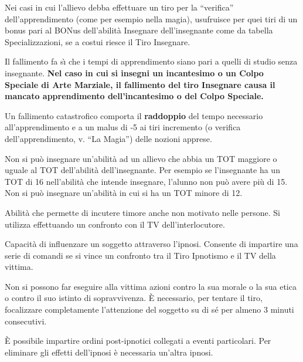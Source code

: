 Nei casi in cui l'allievo debba effettuare un tiro per la ``verifica''
dell'apprendimento (come per esempio nella magia), usufruisce per quei
tiri di un bonus pari al BONus dell'abilit\`a Insegnare
dell'insegnante come da tabella Specializzazioni, se a costui riesce
il Tiro Insegnare.

Il fallimento fa s\`{\i} che i tempi di apprendimento siano pari a
quelli di studio senza insegnante.  \textbf{Nel caso in cui si insegni un
incantesimo o un Colpo Speciale di Arte Marziale, il fallimento del
tiro Insegnare causa il mancato apprendimento dell'incantesimo o del
Colpo Speciale.}

Un fallimento catastrofico comporta il \textbf{raddoppio} del tempo necessario
all'apprendimento e a un malus di -5 ai tiri incremento (o verifica
dell'apprendimento, v. ``La Magia'') delle nozioni apprese.

Non si pu\`o insegnare un'abilit\`a ad un allievo che abbia un
TOT maggiore o uguale al TOT dell'abilit\`a dell'insegnante. Per
esempio se l'insegnante ha un TOT di 16 nell'abilit\`a che intende
insegnare, l'alunno non pu\`o avere pi\`u di 15. Non si pu\`o
insegnare un'abilit\`a in cui si ha un TOT minore di 12.

  Abilit\`a che permette di incutere
timore anche non motivato nelle persone. Si utilizza effettuando un
confronto con il TV dell'interlocutore.


 Capacit\`a di influenzare un soggetto
attraverso l'ipnosi. Consente di impartire una serie di comandi se si
vince un confronto tra il Tiro Ipnotismo e il TV della vittima.

Non si possono far eseguire alla vittima azioni contro la sua morale o
la sua etica o contro il suo istinto di sopravvivenza. \`E necessario,
per tentare il tiro, focalizzare completamente l'attenzione del
soggetto su di s\'e per almeno 3 minuti consecutivi.

\`E possibile impartire ordini post-ipnotici collegati a
eventi particolari. Per eliminare gli effetti dell'ipnosi \`e
necessaria un'altra ipnosi.

  
